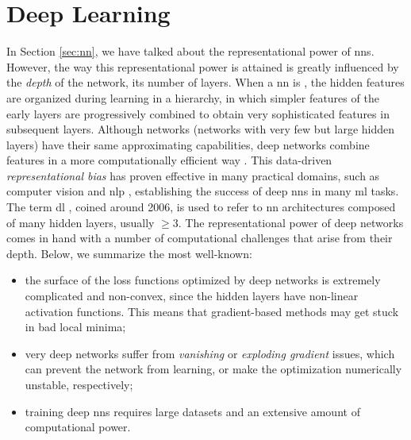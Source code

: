 \section{Deep Learning}\label{sec:deep-learning}
In Section \ref{sec:nn}, we have talked about the representational power of \glspl{nn}. However, the way this representational power is attained is greatly influenced by the \emph{depth} of the network, \ie its number of layers. When a \gls{nn} is , the hidden features are organized during learning in a hierarchy, in which simpler features of the early layers are progressively combined to obtain very sophisticated features in subsequent layers. Although  networks (networks with very few but large hidden layers) have their same approximating capabilities, deep networks combine features in a more computationally efficient way \citep{bengio2009deeparch}. This data-driven \emph{representational bias} has proven effective in many practical domains, such as computer vision \citep{krizhevsky2017imagenet} and \gls{nlp} \citep{vaswani2017transformer}, establishing the success of deep \glspl{nn} in many \gls{ml} tasks. The term \gls{dl} \citep{goodfellow2016dl}, coined around 2006, is used to refer to \gls{nn} architectures composed of many hidden layers, usually $\geq 3$. The representational power of deep networks comes in hand with a number of computational challenges that arise from their depth. Below, we summarize the most well-known:
\begin{itemize}
    \item the surface of the loss functions optimized by deep networks is extremely complicated and non-convex, since the hidden layers have non-linear activation functions. This means that gradient-based methods may get stuck in bad local minima;
    \item very deep networks suffer from \emph{vanishing} or \emph{exploding gradient} issues, which can prevent the network from learning, or make the optimization numerically unstable, respectively;
    \item training deep \glspl{nn} requires large datasets and an extensive amount of computational power.
\end{itemize}
